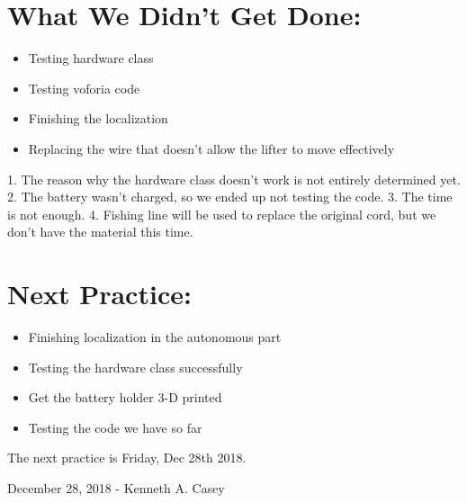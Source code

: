 \documentclass[12pt]{article}
\begin{document}
\section{What We Didn't Get Done:} %
\begin{itemize}
	\item Testing hardware class 
	\item Testing voforia code
	\item Finishing the localization
	\item Replacing the wire that doesn't allow the lifter to move effectively
\end{itemize}


1. The reason why the hardware class doesn't work is not entirely determined yet.
2. The battery wasn't charged, so we ended up not testing the code.
3. The time is not enough. 
4. Fishing line will be used to replace the original cord, but we don't have the material this time.

\section{Next Practice:}
\begin{itemize}
	\item Finishing localization in the autonomous part
	\item Testing the hardware class successfully 
	\item Get the battery holder 3-D printed
	\item Testing the code we have so far
\end{itemize}

The next practice is Friday, Dec 28th 2018. %

\newpage
\setcounter{section}{0}

December 28, 2018 - Kenneth A. Casey 
\end{document}
